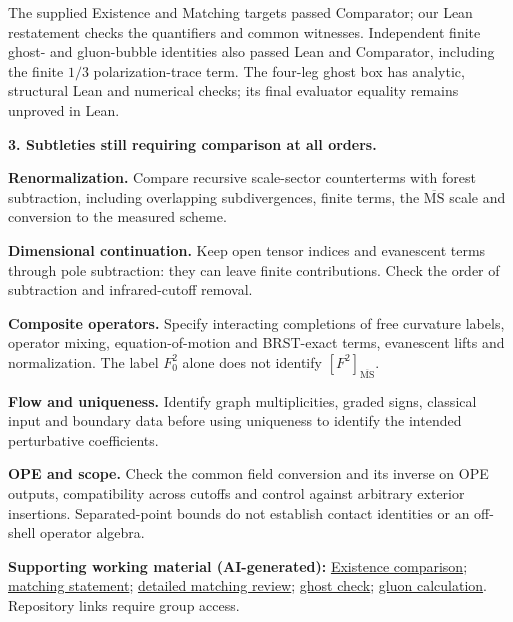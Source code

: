 \documentclass[11pt]{article}
\newcommand{\reviewdoc}[2]{\href{https://github.com/yang-mills-group/submissions/blob/main/reviews/openai-20261104/#1}{#2}}
\begin{document}
The supplied Existence and Matching targets passed Comparator; our Lean
restatement checks the quantifiers and common witnesses. Independent finite
ghost- and gluon-bubble identities also passed Lean and Comparator, including
the finite $1/3$ polarization-trace term. The four-leg ghost box has analytic,
structural Lean and numerical checks; its final evaluator equality remains
unproved in Lean.

\textbf{3. Subtleties still requiring comparison at all orders.}
\begin{list}{\textbullet}{\setlength{\leftmargin}{12pt}\setlength{\itemsep}{2pt}\setlength{\parsep}{0pt}\setlength{\topsep}{2pt}}
\item \textbf{Renormalization.} Compare recursive scale-sector counterterms with
forest subtraction, including overlapping subdivergences, finite terms, the
$\overline{\mathrm{MS}}$ scale and conversion to the measured scheme.
\item \textbf{Dimensional continuation.} Keep open tensor indices and evanescent terms
through pole subtraction: they can leave finite contributions. Check the order
of subtraction and infrared-cutoff removal.
\item \textbf{Composite operators.} Specify interacting completions of free
curvature labels, operator mixing, equation-of-motion and BRST-exact terms,
evanescent lifts and normalization. The label $F_0^2$ alone does not identify
$[F^2]_{\overline{\mathrm{MS}}}$.
\item \textbf{Flow and uniqueness.} Identify graph multiplicities, graded signs,
classical input and boundary data before using uniqueness to identify the
intended perturbative coefficients.
\item \textbf{OPE and scope.} Check the common field conversion and its inverse on
OPE outputs, compatibility across cutoffs and control against arbitrary exterior
insertions. Separated-point bounds do not establish contact identities or an
off-shell operator algebra.
\end{list}


{\small\textbf{Supporting working material (AI-generated):}
\reviewdoc{docs/existence/october-november-existence-comparison.pdf}{Existence comparison};
\reviewdoc{docs/matching/all-orders-statement-review.md}{matching statement};
\reviewdoc{docs/matching/november-matching-assessment-draft.pdf}{detailed matching review};
\reviewdoc{docs/matching/ghost-finite-check.md}{ghost check};
\reviewdoc{docs/matching/gluon-bubble-finite-identity.pdf}{gluon calculation}.
Repository links require group access.}
\end{document}
